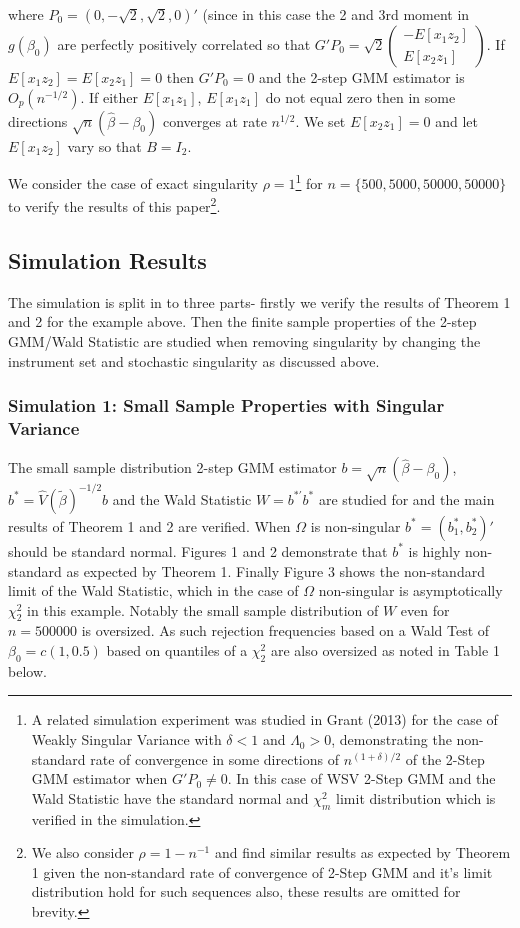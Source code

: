 \documentclass[11pt, fleqn]{article}
\begin{document}
where $P_0=(0, -\sqrt{2},\sqrt{2},0)'$ (since in this case the 2 and 3rd moment in $g(\beta_0)$ are perfectly positively correlated so that $G'P_0=\sqrt{2}\left(\begin{array}{c} -E[x_1z_2] \\ E[x_2 z_1]\end{array}\right)$. If $E[x_1z_2]=E[x_2z_1]=0$ then $G'P_0=0$ and the 2-step GMM estimator is $O_p(n^{-1/2})$. If either $E[x_1z_1]$, $E[x_1z_1]$ do not equal zero then in some directions $\sqrt{n}(\hat{\beta}-\beta_0)$ converges at rate $n^{1/2}$. We set $E[x_2z_1]=0$ and let $E[x_1z_2]$ vary so that $B=I_2$.


We consider the case of exact singularity $\rho=1$\footnote{
 A related simulation experiment was studied in Grant (2013) for the case of Weakly Singular Variance with $\delta<1$ and $\Lambda_0>0$, demonstrating the non-standard rate of convergence in some directions of $n^{(1+\delta)/2}$ of the 2-Step GMM estimator when $G'P_0\neq 0$. In this case of WSV 2-Step GMM and the Wald Statistic have the standard normal and $\chi^2_m$ limit distribution which is verified in the simulation.} for $n=\{500,5000,50000,50000\}$ to verify the results of this paper\footnote{We also consider $\rho=1-n^{-1}$ and find similar results as expected by Theorem 1 given the non-standard rate of convergence of 2-Step GMM and it's limit distribution hold for such sequences also, these results are omitted for brevity.}.


\subsection{Simulation Results}
The simulation is split in to three parts- firstly we verify the results of Theorem 1 and 2 for the example above. Then the finite sample properties of the 2-step GMM/Wald Statistic are studied when removing singularity by changing the instrument set and stochastic singularity as discussed above.\\


\subsubsection{Simulation 1: Small Sample Properties with Singular Variance }
The small sample distribution 2-step GMM estimator $b=\sqrt{n}(\hat{\beta}-\beta_0)$, $b^*=\hat{V}(\tilde{\beta})^{-1/2}b$ and the Wald Statistic $W=b^{*'}b^{*}$ are studied for  and the main results of Theorem 1 and 2 are verified.  When $\Omega$ is non-singular $b^*=(b_1^*,b_2^*)'$ should be standard normal. Figures 1 and 2 demonstrate that $b^*$ is highly non-standard as expected by Theorem 1. Finally Figure 3 shows the non-standard limit of the Wald Statistic, which in the case of $\Omega$ non-singular is asymptotically $\chi^2_2$ in this example. Notably the small sample distribution of $W$ even for $n=500000$ is oversized. As such rejection frequencies based on a Wald Test of $\beta_0=c(1,0.5)$ based on quantiles of a $\chi^2_2$   are also oversized as noted in Table 1 below.
\end{document}
